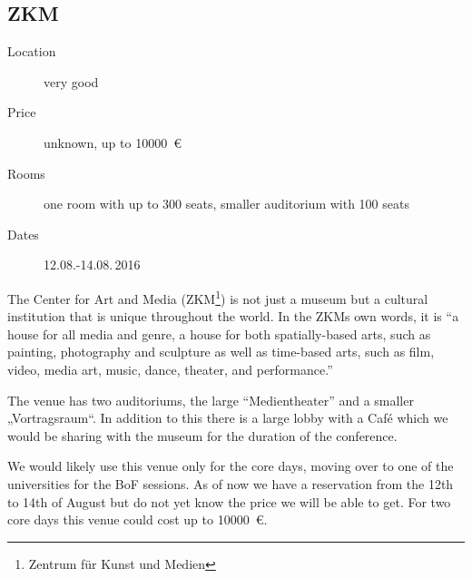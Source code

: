 
\vspace*{4.3cm}

\subsection{ZKM}
\begin{description}
\item[Location] very good
\item[Price] unknown, up to \SI{10000}{\euro}
\item[Rooms] one room with up to 300 seats, smaller auditorium with 100 seats
\item[Dates] 12.08.-14.08.\,2016
\end{description}

The Center for Art and Media (ZKM\footnote{Zentrum für Kunst und Medien}) is not
just a museum but a cultural institution that is unique throughout the world.
In the ZKMs own words, it is “a house for all media and genre, a house for both
spatially-based arts, such as painting, photography and sculpture as well as
time-based arts, such as film, video, media art, music, dance, theater, and performance.”

The venue has two auditoriums, the large “Medientheater” and a smaller
„Vortragsraum“. In addition to this there is a large lobby with a Café which we
would be sharing with the museum for the duration of the conference.

We would likely use this venue only for the core days, moving over to one of the
universities for the BoF sessions. As of now we have a reservation from the
12th to 14th of August but do not yet know the price we will be able to get.
For two core days this venue could cost up to \SI{10000}{\euro}.

